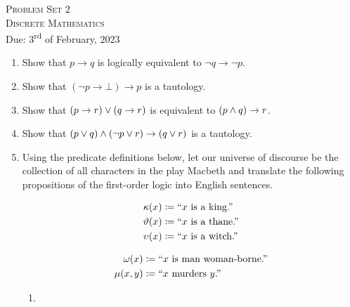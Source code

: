 




\begin{center}
    \textsc{\huge Problem Set 2}\\
    \textsc{\large Discrete Mathematics}\\
    {\color{gruvred}Due: \(3\)\textsuperscript{rd} of February, \(2023\)}
\end{center}

\begin{enumerate}
    \item
        Show that \(p \rightarrow q\) is logically equivalent to \(\neg q \rightarrow \neg p\).
    \item
        Show that \((\neg p \rightarrow \bot)  \rightarrow p\) is a tautology.
    \item
        Show that \((p \rightarrow r) \vee (q \rightarrow r)\) is equivalent to \((p \wedge q) \rightarrow r\).
    \item
        Show that \((p \vee q) \wedge (\neg p \vee r) \rightarrow (q \vee r)\) is a tautology.
    \item
        Using the predicate definitions below,
        let our universe of discourse be the collection of all characters in the play Macbeth
        and translate the following propositions of the first-order logic into English sentences.\\
        \begin{minipage}{.5\linewidth}
            \begin{align*}
                \kappa(x) &\coloneqq \text{``}x\text{ is a king.''}\\
                \vartheta(x) &\coloneqq \text{``}x\text{ is a thane.''}\\
                \upsilon(x) &\coloneqq \text{``}x\text{ is a witch.''}
            \end{align*}
        \end{minipage}%
        \begin{minipage}{.5\linewidth}
            \begin{align*}
                \omega(x) &\coloneqq \text{``}x\text{ is man woman-borne.''}\\
                \mu(x, y) &\coloneqq \text{``}x\text{ murders }y\text{.''}
            \end{align*}
        \end{minipage}
        \begin{enumerate}
            \item

\end{enumerate}
\end{enumerate}
